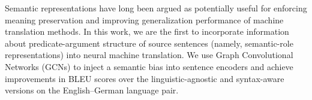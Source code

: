 Semantic representations have long been argued as potentially useful for enforcing meaning preservation and improving generalization performance of machine translation methods. In this work, we are the first to incorporate information about predicate-argument structure of source sentences (namely, semantic-role representations) into neural machine translation. We use Graph Convolutional Networks (GCNs) to inject a semantic bias into sentence encoders and achieve improvements in BLEU scores over the linguistic-agnostic and syntax-aware versions on the English--German language pair.
